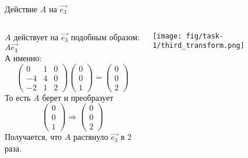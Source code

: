 \begin{frame}{Действие $A$ на $\vec{e_{3}}$}
\begin{columns}
\begin{column}{0.5\paperwidth}
$A$ действует на $\vec{e_{3}}$ подобным образом: $A\vec{e_{3}}$ \\
А именно:
\[
\left(\begin{array}{lll}
    0 & 1 & 0  \\
    -4 & 4 & 0  \\ 
    -2 & 1 & 2 
\end{array}\right)
\left(\begin{array}{l}
    0 \\
    0 \\ 
    1
\end{array}\right) =
\left(\begin{array}{l}
    0 \\
    0 \\
    2
\end{array}\right)
\]
То есть $A$ берет и преобразует
\[
\left(\begin{array}{l}
    0 \\
    0 \\ 
    1 
\end{array}\right) \Rightarrow
\left(\begin{array}{l}
    0 \\
    0 \\
    2
\end{array}\right)
\]
Получается, что $A$ растянуло $\vec{e_{3}}$ в 2 раза. 
\end{column}
\begin{column}{0.2\paperwidth}
\texttt{[image: fig/task-1/third\_transform.png]}
\end{column}
\end{columns}
\end{frame}


